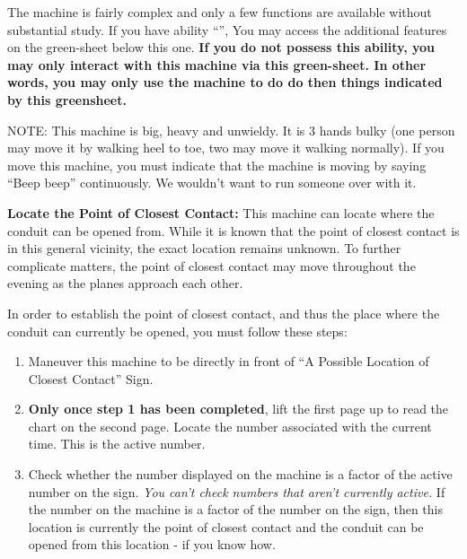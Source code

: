 \documentclass[green]{elementals}
\begin{document}
\name{\gConduitCover{}}


The machine is fairly complex and only a few functions are available without substantial study. If you have ability ``\aWorkConduit{}'', You may access the additional features on the green-sheet below this one. {\bf If you do not possess this ability, you may only interact with this machine via this green-sheet. In other words, you may only use the machine to do do then things indicated by this greensheet.}

NOTE: This machine is big, heavy and unwieldy. It is 3 hands bulky (one person may move it by walking heel to toe, two may move it walking normally). If you move this machine, you must indicate that the machine is moving by saying ``Beep beep'' continuously. We wouldn't want to run someone over with it.


{\bf Locate the Point of Closest Contact:}
This machine can locate where the conduit can be opened from. While it is known that the point of closest contact is in this general vicinity, the exact location remains unknown. To further complicate matters, the point of closest contact may move throughout the evening as the planes approach each other.

In order to establish the point of closest contact, and thus the place where the conduit can currently be opened, you must follow these steps:
\begin{enumerate}
  \item Maneuver this machine to be directly in front of ``A Possible Location of Closest Contact'' Sign.
  \item {\bf Only once step 1 has been completed}, lift the first page up to read the chart on the second page. Locate the number associated with the current time. This is the active number.
  \item Check whether the number displayed on the machine is a factor of the active number on the sign.  \emph{You can't check numbers that aren't currently active.} If the number on the machine is a factor of the number on the sign, then this location is currently the point of closest contact and the conduit can be opened from this location - if you know how.
\end{enumerate}
\end{document}
